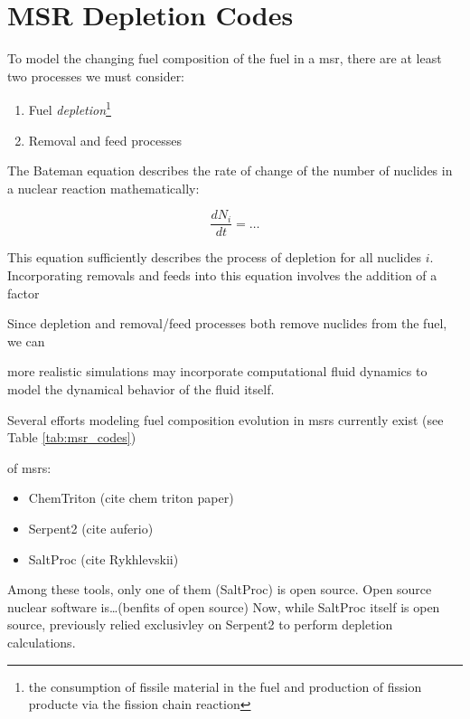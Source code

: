 \section{MSR Depletion Codes}%
\label{sec:msr_codes}

To model the changing fuel composition of the fuel in a \Gls{msr}, there are at least two processes we must consider:
\begin{enumerate}
    \item Fuel {\it depletion}\footnote{the consumption of fissile material in the fuel and production of fission producte via the fission chain reaction}
    \item Removal and feed processes
\end{enumerate}

The Bateman equation describes the rate of change of the number of nuclides in a nuclear reaction mathematically:

\begin{equation}
    \label{eq:bateman-1}
    \frac{dN_{i}}{dt} = \ldots

\end{equation}

This equation sufficiently describes the process of depletion for all nuclides $i$. Incorporating removals and feeds into this equation involves the addition of a factor

Since depletion and removal/feed processes both remove nuclides from the fuel, we can

more realistic simulations may incorporate computational fluid dynamics to model the dynamical behavior of the fluid itself.

Several efforts modeling fuel composition evolution in \Gls{msr}s currently exist (see Table \ref{tab:msr_codes})

of \Gls{msr}s:
\begin{itemize}
    \item ChemTriton (cite chem triton paper)
    \item Serpent2 (cite auferio)
    \item SaltProc (cite Rykhlevskii)
\end{itemize}

Among these tools, only one of them (SaltProc) is open source. Open source nuclear software is\ldots (benfits of open source) 
Now, while SaltProc itself is open source, previously relied exclusivley on Serpent2 to perform depletion calculations.


